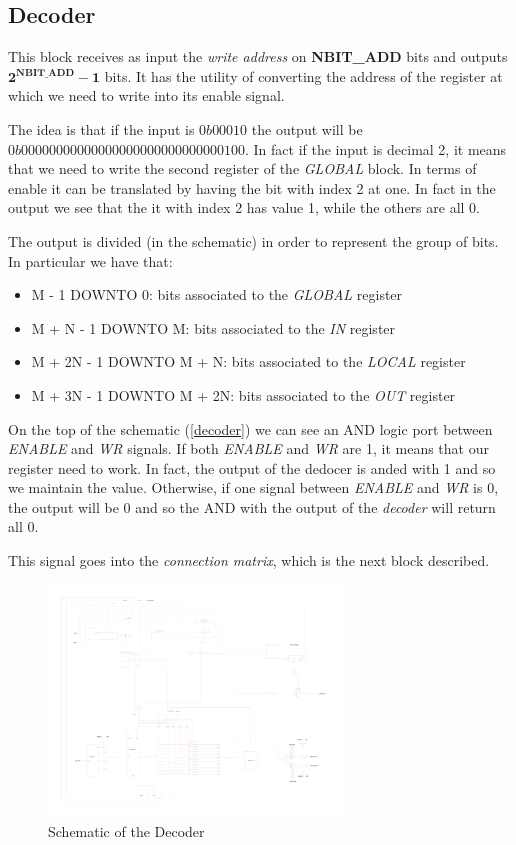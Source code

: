 \subsection{Decoder}
This block receives as input the \emph{write address} on \textbf{NBIT\_ADD} bits and outputs \(\mathbf{2^{NBIT\_ADD} - 1} \) bits. It has the utility of converting the address of the register at which we need to write into its enable signal. 

The idea is that if the input is \(0b00010\) the output will be \(0b00000000000000000000000000000100\). In fact if the input is decimal 2, it means that we need to write the second register of the \emph{GLOBAL} block. In terms of enable it can be translated by having the bit with index 2 at one. In fact in the output we see that the it with index 2 has value 1, while the others are all 0. 

The output is divided (in the schematic) in order to represent the group of bits. In particular we have that: 
\begin{itemize}
    \item M - 1 DOWNTO 0: bits associated to the \emph{GLOBAL} register
    \item M + N - 1 DOWNTO M: bits associated to the \emph{IN} register
    \item M + 2N - 1 DOWNTO M + N: bits associated to the \emph{LOCAL} register
    \item M + 3N - 1 DOWNTO M + 2N: bits associated to the \emph{OUT} register
\end{itemize}

On the top of the schematic (\autoref{decoder}) we can see an AND logic port between \emph{ENABLE} and \emph{WR} signals. If both \emph{ENABLE} and \emph{WR} are 1, it means that our register need to work. In fact, the output of the dedocer is anded with 1 and so we maintain the value. Otherwise, if one signal between \emph{ENABLE} and \emph{WR} is 0, the output will be 0 and so the AND with the output of the \emph{decoder} will return all 0. 

This signal goes into the \emph{connection matrix}, which is the next block described. 

\begin{figure}[ht]
    \centering
    \includegraphics[width=0.7\textwidth]{chapters/4_DecodeStage/images/Decoder.pdf}
    \caption{Schematic of the Decoder}
    \label{decoder}
\end{figure}

